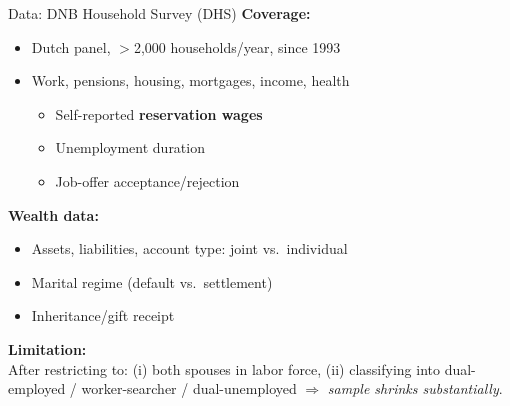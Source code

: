 \documentclass[aspectratio=169, 11pt]{beamer}
\newcommand{\highlight}[1]{\textcolor{blue!80!black}{\textbf{#1}}}
\begin{document}
\begin{frame}{Data: DNB Household Survey (DHS)}
\textbf{Coverage:}
\begin{itemize}
  \item Dutch panel, $>$2,000 households/year, since 1993
  \item Work, pensions, housing, mortgages, income, health
  \begin{itemize}
    \item Self-reported \highlight{reservation wages}
    \item Unemployment duration
    \item Job-offer acceptance/rejection
  \end{itemize}
\end{itemize}
\vspace{0.8em}
\textbf{Wealth data:}
\begin{itemize}
  \item Assets, liabilities, account type: joint vs.\ individual
  \item Marital regime (default vs.\ settlement)
  \item Inheritance/gift receipt
\end{itemize}

\vspace{0.8em}
\small
\textbf{Limitation:}\\
After restricting to: (i) both spouses in labor force, (ii) classifying into dual-employed / worker-searcher / dual-unemployed $\Rightarrow$ \emph{sample shrinks substantially}.
\vspace{0.3em}

\end{frame}
\end{document}
